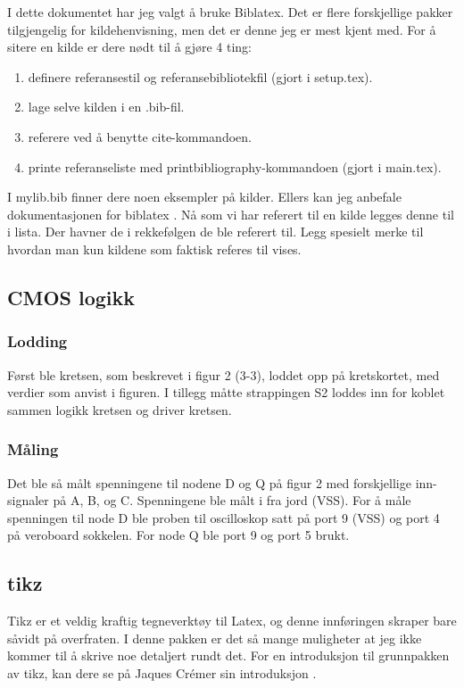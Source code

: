 I dette dokumentet har jeg valgt å bruke Biblatex. Det er flere forskjellige pakker tilgjengelig for
kildehenvisning, men det er denne jeg er mest kjent med. For å sitere en kilde er dere nødt til å gjøre 4 ting:
\begin{enumerate}
    \item definere referansestil og referansebibliotekfil (gjort i setup.tex).
    \item lage selve kilden i en .bib-fil.
    \item referere ved å benytte cite-kommandoen.
    \item printe referanseliste med printbibliography-kommandoen (gjort i main.tex).
\end{enumerate}

I mylib.bib finner dere noen eksempler på kilder. Ellers kan jeg anbefale dokumentasjonen for biblatex \cite{biblatex}.
Nå som vi har referert til en kilde legges denne til i lista. Der havner de i rekkefølgen de ble referert til.
Legg spesielt merke til hvordan man kun kildene som faktisk referes til vises. 


\newpage %
\subsection{CMOS logikk}

\subsubsection{Lodding}
Først ble kretsen, som beskrevet i figur 2 (3-3), loddet opp på kretskortet, med verdier som anvist i figuren. I tillegg måtte strappingen S2 loddes inn for koblet sammen logikk kretsen og driver kretsen.

\subsubsection{Måling}
Det ble så målt spenningene til nodene D og Q på figur 2 med forskjellige inn-signaler på A, B, og C. 
Spenningene ble målt i fra jord (VSS). For å måle spenningen til node D ble proben til oscilloskop satt på port 9 (VSS) og port 4 på veroboard sokkelen. 
For node Q ble port 9 og port 5 brukt.



\subsection{tikz}
Tikz er et veldig kraftig tegneverktøy til Latex, og denne innføringen skraper bare såvidt på overfraten.
I denne pakken er det så mange muligheter at jeg ikke kommer til å skrive noe detaljert rundt det.
For en introduksjon til grunnpakken av tikz, kan dere se på Jaques Crémer sin introduksjon \cite{tikz_intro}.

